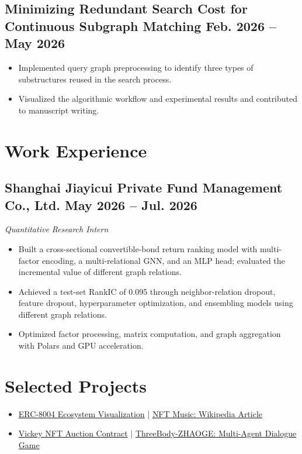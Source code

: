\documentclass{resume}
\begin{document}
\subsection{\textbf{Minimizing Redundant Search Cost for Continuous Subgraph Matching} \hfill Feb. 2026 -- May 2026}
\begin{itemize}[parsep=0.2ex]
  \item Implemented query graph preprocessing to identify three types of substructures reused in the search process.
  \item Visualized the algorithmic workflow and experimental results and contributed to manuscript writing.
\end{itemize}

\section{Work Experience}
\subsection{\textbf{Shanghai Jiayicui Private Fund Management Co., Ltd.} \hfill May 2026 -- Jul. 2026}
\textit{Quantitative Research Intern}
\begin{itemize}[parsep=0.2ex]
  \item Built a cross-sectional convertible-bond return ranking model with multi-factor encoding, a multi-relational GNN, and an MLP head; evaluated the incremental value of different graph relations.
  \item Achieved a test-set RankIC of 0.095 through neighbor-relation dropout, feature dropout, hyperparameter optimization, and ensembling models using different graph relations.
  \item Optimized factor processing, matrix computation, and graph aggregation with Polars and GPU acceleration.
\end{itemize}

\section{Selected Projects}
\begin{itemize}[parsep=0.2ex]
  \item \href{https://ethresear.ch/t/does-erc-8004-form-an-agent-to-agent-trust-network/25322}{ERC-8004 Ecosystem Visualization} \quad | \quad \href{https://en.wikipedia.org/wiki/NFT_music}{NFT Music: Wikipedia Article}
  \item \href{https://sepolia.etherscan.io/address/0xac0f3f908c1115bdba543c2e22c8305a55621c3a}{Vickey NFT Auction Contract} \quad | \quad \href{https://github.com/OB-David/ThreeBody-ZHAOGE}{ThreeBody-ZHAOGE: Multi-Agent Dialogue Game}
\end{itemize}
\end{document}
